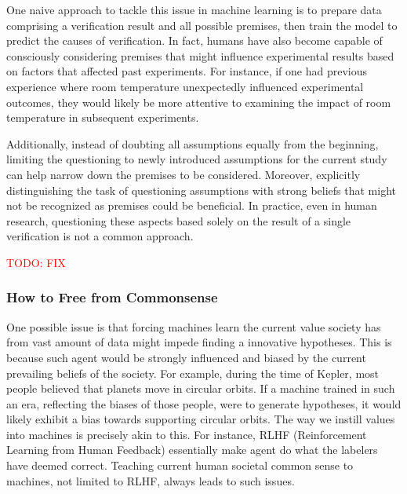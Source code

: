 One naive approach to tackle this issue in machine learning is to prepare data comprising a verification result and all possible premises, then train the model to predict the causes of verification. In fact, humans have also become capable of consciously considering premises that might influence experimental results based on factors that affected past experiments. For instance, if one had previous experience where room temperature unexpectedly influenced experimental outcomes, they would likely be more attentive to examining the impact of room temperature in subsequent experiments.

Additionally, instead of doubting all assumptions equally from the beginning, limiting the questioning to newly introduced assumptions for the current study can help narrow down the premises to be considered. Moreover, explicitly distinguishing the task of questioning assumptions with strong beliefs that might not be recognized as premises could be beneficial. In practice, even in human research, questioning these aspects based solely on the result of a single verification is not a common approach.

\textcolor{red}{TODO: FIX}

\subsubsection{How to Free from Commonsense}

One possible issue is that forcing machines learn the current value society has from vast amount of data might impede finding a innovative hypotheses. This is because such agent would be strongly influenced and biased by the current prevailing beliefs of the society. For example, during the time of Kepler, most people believed that planets move in circular orbits. If a machine trained in such an era, reflecting the biases of those people, were to generate hypotheses, it would likely exhibit a bias towards supporting circular orbits. The way we instill values into machines is precisely akin to this. For instance, RLHF (Reinforcement Learning from Human Feedback) essentially make agent do what the labelers have deemed correct. Teaching current human societal common sense to machines, not limited to RLHF, always leads to such issues.
 

